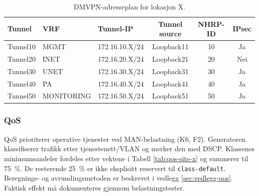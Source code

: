 \begin{table}[H]
    \centering
    \caption{DMVPN-adresseplan for lokasjon X.}
    \label{tab:dmvpn-site-x}
    \small
    \renewcommand{\arraystretch}{1.3}
    \setlength{\tabcolsep}{5pt}
    \begin{tabular}{lllccc}
        \toprule
        \rowcolor{tablegreen}
        \color{white}\textbf{Tunnel} &
        \color{white}\textbf{VRF} &
        \color{white}\textbf{Tunnel-IP} &
        \color{white}\textbf{Tunnel source} &
        \color{white}\textbf{NHRP-ID} &
        \color{white}\textbf{IPsec} \\
        \midrule
        Tunnel10 & MGMT       & 172.16.10.X/24 & Loopback11 & 10 & Ja \\
        Tunnel20 & INET       & 172.16.20.X/24 & Loopback21 & 20 & Nei \\
        Tunnel30 & UNET       & 172.16.30.X/24 & Loopback31 & 30 & Ja \\
        Tunnel40 & PA         & 172.16.40.X/24 & Loopback41 & 40 & Ja \\
        Tunnel50 & MONITORING & 172.16.50.X/24 & Loopback51 & 50 & Ja \\
        \bottomrule
    \end{tabular}
\end{table}

\subsubsection{QoS}
QoS prioriterer operative tjenester ved MAN-belastning (K6, F2). Generatoren klassifiserer trafikk etter tjenestenett/VLAN og merker den med DSCP. Klassenes minimumsandeler fordeles etter vektene i Tabell \ref{tab:qos-site-x} og summerer til 75~\%. De resterende 25~\% er ikke eksplisitt reservert til \texttt{class-default}. Beregnings- og avrundingsmetoden er beskrevet i vedlegg \ref{sec:vedlegg-qos}. Faktisk effekt må dokumenteres gjennom belastningstester.


